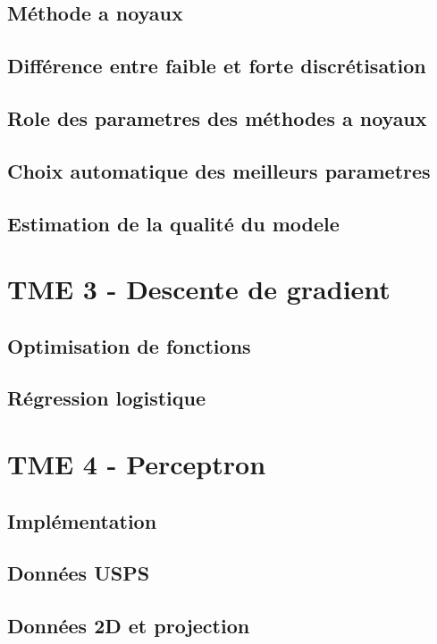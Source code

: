 \documentclass{article}
\begin{document}
\subsection*{Méthode a noyaux}

\subsection*{Différence entre faible et forte
discrétisation}

\subsection*{Role des parametres des méthodes a noyaux}

\subsection*{Choix automatique des meilleurs parametres}

\subsection*{Estimation de la qualité du modele}

\section*{TME 3 - Descente de gradient}

\subsection*{Optimisation de fonctions}

\subsection*{Régression logistique}

\section*{TME 4 - Perceptron}

\subsection*{Implémentation}

\subsection*{Données USPS}

\subsection*{Données 2D et projection}
\end{document}
